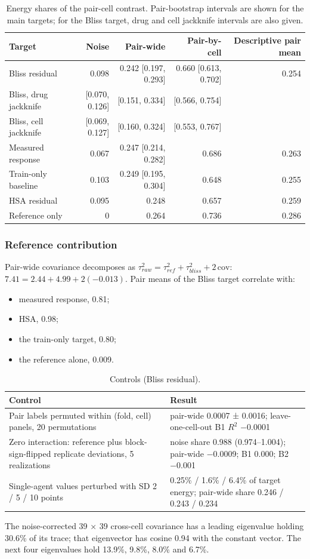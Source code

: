 \documentclass[11pt]{article}
\begin{document}
\begin{table}[htbp]
\caption{Energy shares of the pair-cell contrast. Pair-bootstrap intervals are shown for the main targets; for the Bliss target, drug and cell jackknife intervals are also given.}\label{tab:S3}
\centering\small
\begin{tabularx}{\linewidth}{@{}L r r r r@{}}
\toprule
Target & Noise & Pair-wide & Pair-by-cell & Descriptive pair mean \\
\midrule
Bliss residual & 0.098 & 0.242 [0.197, 0.293] & 0.660 [0.613, 0.702] & 0.254 \\
Bliss, drug jackknife & [0.070, 0.126] & [0.151, 0.334] & [0.566, 0.754] &  \\
Bliss, cell jackknife & [0.069, 0.127] & [0.160, 0.324] & [0.553, 0.767] &  \\
Measured response & 0.067 & 0.247 [0.214, 0.282] & 0.686 & 0.263 \\
Train-only baseline & 0.103 & 0.249 [0.195, 0.304] & 0.648 & 0.255 \\
HSA residual & 0.095 & 0.248 & 0.657 & 0.259 \\
Reference only & 0 & 0.264 & 0.736 & 0.286 \\
\bottomrule
\end{tabularx}
\end{table}
\subsubsection*{Reference contribution} Pair-wide covariance decomposes as $\tau^2_{raw}=\tau^2_{ref}+\tau^2_{bliss}+2\,\mathrm{cov}$: $7.41=2.44+4.99+2(-0.013)$. Pair means of the Bliss target correlate with:

\begin{itemize}
\item measured response, 0.81;
\item HSA, 0.98;
\item the train-only target, 0.80;
\item the reference alone, 0.009.
\end{itemize}
\begin{table}[htbp]
\caption{Controls (Bliss residual).}\label{tab:S4}
\centering\small
\begin{tabularx}{\linewidth}{@{}L L@{}}
\toprule
Control & Result \\
\midrule
Pair labels permuted within (fold, cell) panels, 20 permutations & pair-wide 0.0007 ± 0.0016; leave-one-cell-out B1 $R^2$ −0.0001 \\
Zero interaction: reference plus block-sign-flipped replicate deviations, 5 realizations & noise share 0.988 (0.974–1.004); pair-wide −0.0009; B1 0.000; B2 −0.001 \\
Single-agent values perturbed with SD 2 / 5 / 10 points & 0.25\% / 1.6\% / 6.4\% of target energy; pair-wide share 0.246 / 0.243 / 0.234 \\
\bottomrule
\end{tabularx}
\end{table}
The noise-corrected 39 × 39 cross-cell covariance has a leading eigenvalue holding 30.6\% of its trace; that eigenvector has cosine 0.94 with the constant vector. The next four eigenvalues hold 13.9\%, 9.8\%, 8.0\% and 6.7\%.
\end{document}
